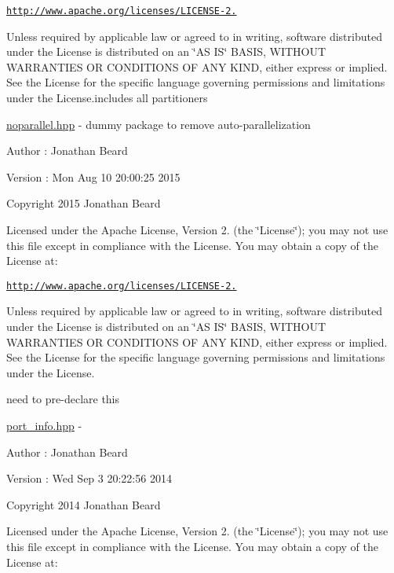 \href{http://www.apache.org/licenses/LICENSE-2.0}{\tt http\+://www.\+apache.\+org/licenses/\+L\+I\+C\+E\+N\+S\+E-\/2.}

Unless required by applicable law or agreed to in writing, software distributed under the License is distributed on an \char`\"{}\+A\+S I\+S\char`\"{} B\+A\+S\+IS, W\+I\+T\+H\+O\+UT W\+A\+R\+R\+A\+N\+T\+I\+ES OR C\+O\+N\+D\+I\+T\+I\+O\+NS OF A\+NY K\+I\+ND, either express or implied. See the License for the specific language governing permissions and limitations under the License.\+includes all partitioners

\hyperlink{noparallel_8hpp_source}{noparallel.\+hpp} -\/ dummy package to remove auto-\/parallelization \begin{DoxyAuthor}{Author}
\+: Jonathan Beard 
\end{DoxyAuthor}
\begin{DoxyVersion}{Version}
\+: Mon Aug 10 20\+:00\+:25 2015
\end{DoxyVersion}
Copyright 2015 Jonathan Beard

Licensed under the Apache License, Version 2. (the \char`\"{}\+License\char`\"{}); you may not use this file except in compliance with the License. You may obtain a copy of the License at\+:

\href{http://www.apache.org/licenses/LICENSE-2.0}{\tt http\+://www.\+apache.\+org/licenses/\+L\+I\+C\+E\+N\+S\+E-\/2.}

Unless required by applicable law or agreed to in writing, software distributed under the License is distributed on an \char`\"{}\+A\+S I\+S\char`\"{} B\+A\+S\+IS, W\+I\+T\+H\+O\+UT W\+A\+R\+R\+A\+N\+T\+I\+ES OR C\+O\+N\+D\+I\+T\+I\+O\+NS OF A\+NY K\+I\+ND, either express or implied. See the License for the specific language governing permissions and limitations under the License.

need to pre-\/declare this

\hyperlink{port__info_8hpp_source}{port\+\_\+info.\+hpp} -\/ \begin{DoxyAuthor}{Author}
\+: Jonathan Beard 
\end{DoxyAuthor}
\begin{DoxyVersion}{Version}
\+: Wed Sep 3 20\+:22\+:56 2014
\end{DoxyVersion}
Copyright 2014 Jonathan Beard

Licensed under the Apache License, Version 2. (the \char`\"{}\+License\char`\"{}); you may not use this file except in compliance with the License. You may obtain a copy of the License at\+:

